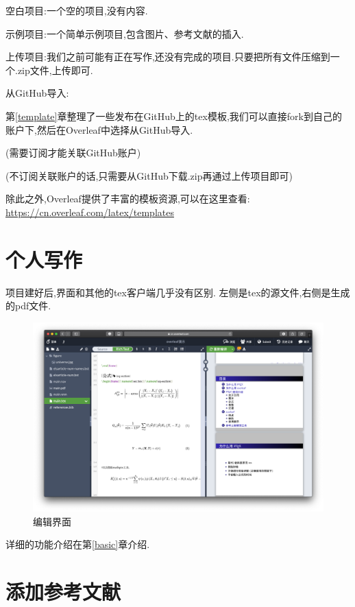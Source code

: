 \documentclass[]{ctexbook}
\begin{document}
空白项目:一个空的项目,没有内容.

示例项目:一个简单示例项目,包含图片、参考文献的插入.

上传项目:我们之前可能有正在写作,还没有完成的项目.只要把所有文件压缩到一个.zip文件,上传即可.

从GitHub导入:

第\ref{template}章整理了一些发布在GitHub上的tex模板,我们可以直接fork到自己的账户下,然后在Overleaf中选择从GitHub导入.

(需要订阅才能关联GitHub账户)

(不订阅关联账户的话,只需要从GitHub下载.zip再通过上传项目即可)

除此之外,Overleaf提供了丰富的模板资源,可以在这里查看:
\url{https://cn.overleaf.com/latex/templates}

\hypertarget{section-4}{%
\section{个人写作}\label{section-4}}

项目建好后,界面和其他的tex客户端几乎没有区别.
左侧是tex的源文件,右侧是生成的pdf文件.

\begin{figure}
\centering
\includegraphics{figure/editepage.png}
\caption{编辑界面}
\end{figure}

详细的功能介绍在第\ref{basic}章介绍.

\hypertarget{section-5}{%
\section{添加参考文献}\label{section-5}}
\end{document}
